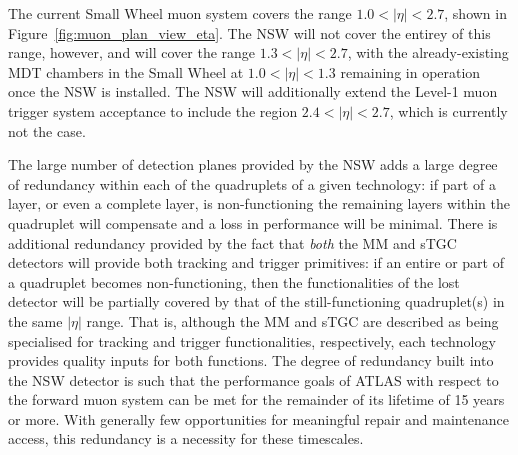 The current Small Wheel muon system covers the range $1.0 < \lvert \eta \rvert < 2.7$, shown
in Figure~\ref{fig:muon_plan_view_eta}.
The NSW will not cover the entirey of this range, however, and will cover the
range $1.3 < \lvert \eta \rvert < 2.7$, with the already-existing MDT chambers in the Small Wheel at $1.0 < \lvert \eta  \rvert < 1.3$
remaining in operation once the NSW is installed.
The NSW will additionally extend the Level-1 muon trigger system acceptance to include
the region $2.4 < \lvert \eta \rvert < 2.7$, which is currently not the case.

The large number of detection planes provided by the NSW adds a large degree of redundancy
within each of the quadruplets of a given technology: if part of a layer, or even a complete layer,
is non-functioning the remaining layers within the quadruplet will compensate and a loss in performance
will be minimal.
There is additional redundancy provided by the fact that \textit{both} the MM and sTGC detectors
will provide both tracking and trigger primitives: if an entire or part of a quadruplet becomes
non-functioning, then the functionalities of the lost detector will be partially covered
by that of the still-functioning quadruplet(s) in the same $\lvert \eta \rvert$ range.
That is, although the MM and sTGC are described as being specialised for tracking and trigger functionalities,
respectively, each technology provides quality inputs for both functions.
The degree of redundancy built into the NSW detector is such that the performance goals
of ATLAS with respect to the forward muon system can be met for the remainder of its
lifetime of 15 years or more.
With generally few opportunities for meaningful repair and maintenance access, this redundancy is
a necessity for these timescales.

